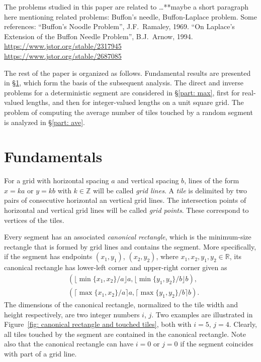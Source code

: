 \documentclass[12pt, a4paper]{article}
\begin{document}

The problems studied in this paper are related to \ldots ***maybe a short paragraph here mentioning related problems: Buffon's needle, Buffon-Laplace problem. Some references: ``Buffon's Noodle Problem'', J.F.~Ramaley, 1969. ``On Laplace's Extension of the Buffon Needle Problem'', B.J.~Arnow, 1994. \\
\url{https://www.jstor.org/stable/2317945} \\
\url{https://www.jstor.org/stable/2687085}

The rest of the paper is organized as follows. Fundamental results are presented in \S\ref{part: fund results}, which form the basis of the subsequent analysis. The direct and inverse problems for a deterministic segment are considered in \S\ref{part: max}, first for real-valued lengths, and then for integer-valued lengths on a unit square grid. The problem of computing the average number of tiles touched by a random segment is analyzed in \S\ref{part: ave}.



\section{Fundamentals}
\label{part: fund results}

For a grid with horizontal spacing $a$ and vertical spacing $b$, lines of the form $x = ka$ or $y = kb$ with $k \in \mathbb Z$ will be called \emph{grid lines}. A \emph{tile} is delimited by two pairs of consecutive horizontal an vertical grid lines. The intersection points of horizontal and vertical grid lines will be called \emph{grid points}. These correspond to vertices of the tiles.

Every segment has an associated \emph{canonical rectangle}, which is the minimum-size rectangle that is formed by grid lines and contains the segment. More specifically, if the segment has endpoints $(x_1,y_1)$, $(x_2,y_2)$, where $x_1, x_2, y_1, y_2 \in \mathbb R$, its canonical rectangle has lower-left corner and upper-right corner given as
\begin{align*}
& (\lfloor\min\{x_1, x_2\}/a\rfloor a, \lfloor\min\{y_1,y_2\}/b\rfloor b), \\
& (\lceil\max\{x_1, x_2\}/a \rceil a, \lceil\max\{y_1,y_2\}/b \rceil b).
\end{align*}
The dimensions of the canonical rectangle, normalized to the tile width and height respectively, are two integer numbers $i$, $j$. Two examples are illustrated in Figure~\ref{fig: canonical rectangle and touched tiles}, both with $i=5$, $j=4$. Clearly, all tiles touched by the segment are contained in the canonical rectangle. Note also that the canonical rectangle can have $i=0$ or $j=0$ if the segment coincides with part of a grid line.
\end{document}
